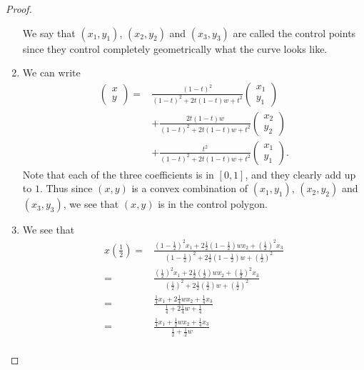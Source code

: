 \begin{proof}
\begin{enumerate}
        We say that $(x_1,y_1)$, $(x_2, y_2)$ and $(x_3,y_3)$ are called the control points since they control completely geometrically what the curve looks like.
        \item We can write
        \begin{align*}
            \left(\begin{array}{c} 
                x\\ 
                y \end{array}\right) 
            =& \frac{(1-t)^2}{(1-t)^2 + 2t(1-t)w + t^2}
            \left(\begin{array}{c} 
                x_1\\ 
                y_1 \end{array}\right)\\
            & +\frac{2t(1-t)w}{(1-t)^2 + 2t(1-t)w + t^2}
            \left(\begin{array}{c} 
                x_2\\ 
                y_2  \end{array}\right)\\
            & + \frac{t^2}{(1-t)^2 + 2t(1-t)w + t^2}
            \left(\begin{array}{c} 
                x_1\\ 
                y_1 \end{array}\right).
        \end{align*}
        Note that each of the three coefficients is in $[0,1]$, and they clearly add up to $1$. 
        Thus since $(x,y)$ is a convex combination of $(x_1,y_1)$, $(x_2,y_2)$ and $(x_3,y_3)$, we see that $(x,y)$ is in the control polygon.
        \item We see that
        \begin{align*}
           x\left(\frac{1}{2}\right)
           =& \frac{\left(1-\frac{1}{2}\right)^2 x_1 + 2\frac{1}{2}\left(1-\frac{1}{2}\right)wx_2 + \left(\frac{1}{2}\right)^2 x_3}{\left(1-\frac{1}{2}\right)^2 + 2\frac{1}{2}\left(1-\frac{1}{2}\right)w + \left(\frac{1}{2}\right)^2}\\
           =& \frac{\left(\frac{1}{2}\right)^2 x_1 + 2\frac{1}{2}\left(\frac{1}{2}\right)wx_2 + \left(\frac{1}{2}\right)^2 x_3}{\left(\frac{1}{2}\right)^2 + 2\frac{1}{2}\left(\frac{1}{2}\right)w + \left(\frac{1}{2}\right)^2}\\
           =& \frac{\frac{1}{4} x_1 + 2\frac{1}{4}wx_2 + \frac{1}{4} x_3}{\frac{1}{4} + 2\frac{1}{4}w + \frac{1}{4}}\\
           =& \frac{\frac{1}{4} x_1 + \frac{1}{2}wx_2 + \frac{1}{4} x_3}{\frac{1}{2} + \frac{1}{2}w}\\

\end{align*}
\end{enumerate}
\end{proof}

